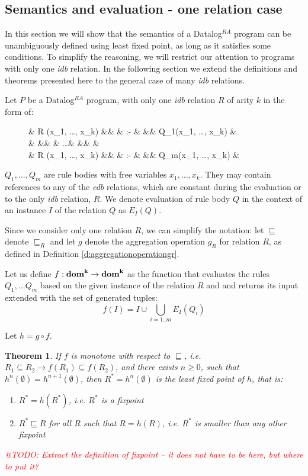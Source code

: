 \documentclass{pracamgr}
\makeatletter
\theoremstyle{plain}
\newtheorem{thm}{Theorem}[section]
\theoremstyle{definition}
\theoremstyle{remark}
\newcommand{\todo}[1]{\textcolor{red}{@TODO: #1}}
\newcommand{\datalogra}{Datalog$^{RA}$ }
\newcommand{\narrow}[1]{\begin{changemargin}{2cm}{2cm} #1 \end{changemargin}}
\makeatother
\begin{document}
\subsection{Semantics and evaluation - one relation case}
In this section we will show that the semantics of a \datalogra program can be unambiguously defined using least fixed point, as long as it satisfies some conditions. To simplify the reasoning, we will restrict our attention to programs with only one \emph{idb} relation. In the following section we extend the definitions and theorems presented here to the general case of many \emph{idb} relations.

Let $P$ be a \datalogra program, with only one \emph{idb} relation $R$ of arity $k$ in the form of:

\begin{figure}[h!]
\narrow{
  \begin{flalign*}
  & \textsc{R} (x_1, \dots, x_k) &&  & :- & && Q_1(x_1, \dots, x_k) & \\
  &  &&  & \dots & && & \\
  & \textsc{R} (x_1, \dots, x_k) &&  & :- & && Q_m(x_1, \dots, x_k) & \\
  \end{flalign*}
}
\end{figure}

$Q_1, \dots, Q_m$ are rule bodies with free variables $x_1, \dots, x_k$. They may contain references to any of the \emph{edb} relations, which are constant during the evaluation or to the only \emph{idb} relation, $R$. We denote evaluation of rule body $Q$ in the context of an instance $I$ of the relation $Q$ as $E_I(Q)$.

Since we consider only one relation $R$, we can simplify the notation: let $\sqsubseteq$ denote $\sqsubseteq_R$ and let $g$ denote the aggregation operation $g_R$ for relation $R$, as defined in Definition \ref{d:aggregationoperationgr}.

Let us define $f: \bf{dom}^k \to \bf{dom}^k$ as the function that evaluates the rules $Q_1, ... Q_m$ based on the given instance of the relation $R$ and and returns its input extended with the set of generated tuples:
$$ f(I) = I \cup \bigcup_{i=1..m} E_I(Q_i) $$

Let $h = g \circ f$. 


\begin{thm}
If $f$ is monotone with respect to $\sqsubseteq$, i.e. $R_1 \subseteq R_2 \rightarrow f(R_1) \subseteq f(R_2)$, and there exists $n \ge 0 $, such that $h^n(\emptyset) = h^{n+1}(\emptyset)$, then $R^* = h^n(\emptyset)$ is the least fixed point of $h$, that is:
\begin{enumerate}
\item $R^* = h(R^*)$, i.e. $R^*$ is a fixpoint
\item $R^* \sqsubseteq R$ for all $R$ such that $R = h(R)$, i.e. $R^*$ is smaller than any other fixpoint
\end{enumerate}
\todo{Extract the definition of fixpoint -- it does not have to be here, but where to put it?}
\end{thm}
\end{document}
